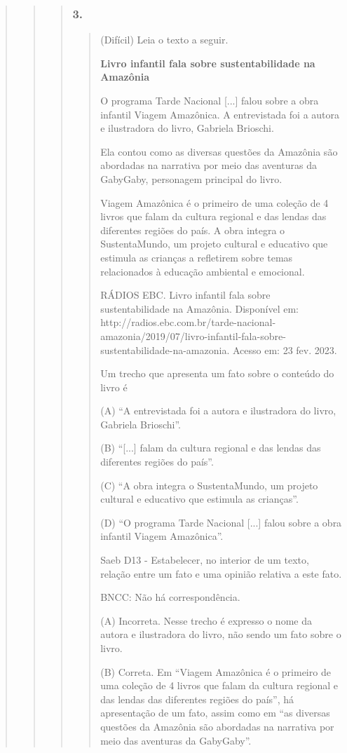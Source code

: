 \begin{quote}
\begin{quote}
\begin{quote}
\subsubsection{3.}\label{section-65}

\begin{quote}
(Difícil) Leia o texto a seguir.

\textbf{Livro infantil fala sobre sustentabilidade na Amazônia}

O programa Tarde Nacional {[}...{]} falou sobre a obra infantil Viagem
Amazônica. A entrevistada foi a autora e ilustradora do livro, Gabriela
Brioschi.

Ela contou como as diversas questões da Amazônia são abordadas na
narrativa por meio das aventuras da GabyGaby, personagem principal do
livro.~

Viagem Amazônica é o primeiro de uma coleção de 4 livros que falam da
cultura regional e das lendas das diferentes regiões do país. A obra
integra o SustentaMundo, um projeto cultural e educativo que estimula as
crianças a refletirem sobre temas relacionados à educação ambiental e
emocional.

RÁDIOS EBC. Livro infantil fala sobre sustentabilidade na Amazônia.
Disponível em:
http://radios.ebc.com.br/tarde-nacional-amazonia/2019/07/livro-infantil-fala-sobre-sustentabilidade-na-amazonia.
Acesso em: 23 fev. 2023.

Um trecho que apresenta um fato sobre o conteúdo do livro é

(A) ``A entrevistada foi a autora e ilustradora do livro, Gabriela
Brioschi''.

(B) ``{[}...{]} falam da cultura regional e das lendas das diferentes
regiões do país''.

(C) ``A obra integra o SustentaMundo, um projeto cultural e educativo
que estimula as crianças''.

(D) ``O programa Tarde Nacional {[}...{]} falou sobre a obra infantil
Viagem Amazônica''.

Saeb D13 - Estabelecer, no interior de um texto, relação entre um fato e
uma opinião relativa a este fato.

BNCC: Não há correspondência.

(A) Incorreta. Nesse trecho é expresso o nome da autora e ilustradora do
livro, não sendo um fato sobre o livro.

(B) Correta. Em ``Viagem Amazônica é o primeiro de uma coleção de 4
livros que falam da cultura regional e das lendas das diferentes regiões
do país'', há apresentação de um fato, assim como em ``as diversas
questões da Amazônia são abordadas na narrativa por meio das aventuras
da GabyGaby''.


\end{quote}
\end{quote}
\end{quote}
\end{quote}
